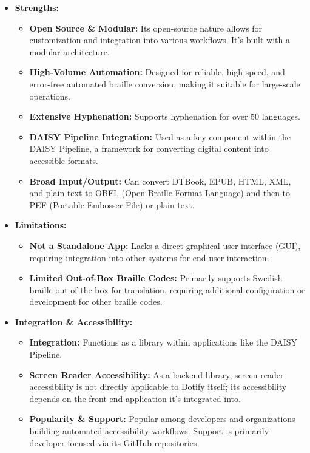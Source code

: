 \begin{itemize}
    \item \textbf{Strengths:}
    \begin{itemize}
        \item \textbf{Open Source & Modular:} Its open-source nature allows for customization and integration into various workflows. It's built with a modular architecture.
        \item \textbf{High-Volume Automation:} Designed for reliable, high-speed, and error-free automated braille conversion, making it suitable for large-scale operations.
        \item \textbf{Extensive Hyphenation:} Supports hyphenation for over 50 languages.
        \item \textbf{DAISY Pipeline Integration:} Used as a key component within the DAISY Pipeline, a framework for converting digital content into accessible formats.
        \item \textbf{Broad Input/Output:} Can convert DTBook, EPUB, HTML, XML, and plain text to OBFL (Open Braille Format Language) and then to PEF (Portable Embosser File) or plain text.
    \end{itemize}
    \item \textbf{Limitations:}
    \begin{itemize}
        \item \textbf{Not a Standalone App:} Lacks a direct graphical user interface (GUI), requiring integration into other systems for end-user interaction.
        \item \textbf{Limited Out-of-Box Braille Codes:} Primarily supports Swedish braille out-of-the-box for translation, requiring additional configuration or development for other braille codes.
    \end{itemize}
    \item \textbf{Integration & Accessibility:}
    \begin{itemize}
        \item \textbf{Integration:} Functions as a library within applications like the DAISY Pipeline.
        \item \textbf{Screen Reader Accessibility:} As a backend library, screen reader accessibility is not directly applicable to Dotify itself; its accessibility depends on the front-end application it's integrated into.
        \item \textbf{Popularity \& Support:} Popular among developers and organizations building automated accessibility workflows. Support is primarily developer-focused via its GitHub repositories.
    \end{itemize}
\end{itemize}

